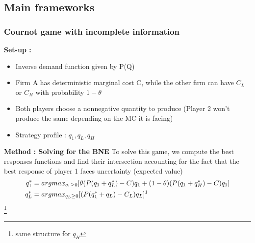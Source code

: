 \documentclass{article}
\begin{document}
\subsection{Main frameworks}

\subsubsection{Cournot game with incomplete information}
\textbf{Set-up : }
\begin{itemize}
    \item Inverse demand function given by P(Q)
    \item Firm A has deterministic marginal cost C, while the other firm can have $C_L$ or $C_H$ with probability $1-\theta$
    \item Both players choose a nonnegative quantity to produce (Player 2 won't produce the same depending on the MC it is facing)
    \item Strategy profile : $q_1,q_L,q_H$
\end{itemize}
\textbf{Method : Solving for the BNE}
To solve this game, we compute the best responses functions and find their intersection accounting for the fact that the best response of player 1 faces uncertainty (expected value)
\begin{equation}
\begin{aligned}
    q_1^* &= argmax_{q_1\geq0}[\theta (P(q_1+q_L^*)-C)q_1+(1-\theta)(P(q_1+q_H^*)-C)q_1]\\
    q_L^* &= argmax_{q_L\geq0}[(P(q_1^*+q_L)-C_L)q_L]\text{\footnotemark}
\end{aligned}
\end{equation}
\footnote{same structure for $q_H$}
\end{document}
